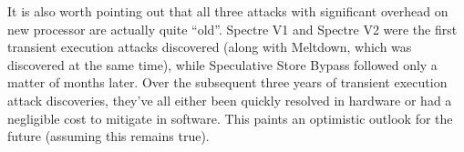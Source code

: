 It is also worth pointing out that all three attacks with significant overhead on new processor are actually quite ``old''.
Spectre V1 and Spectre V2 were the first transient execution attacks discovered (along with Meltdown, which was discovered at the same time), while Speculative Store Bypass followed only a matter of months later.
Over the subsequent three years of transient execution attack discoveries, they've all either been quickly resolved in hardware or had a negligible cost to mitigate in software.
This paints an optimistic outlook for the future (assuming this remains true).
